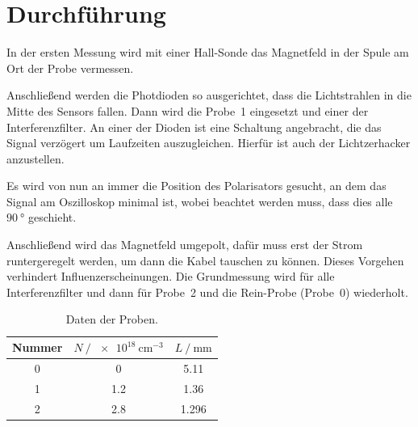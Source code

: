 \section{Durchführung}
\label{sec:durchfuehrung}
In der ersten Messung wird mit einer Hall-Sonde das Magnetfeld in der Spule
am Ort der Probe vermessen.

Anschließend werden die Photdioden so ausgerichtet, dass die Lichtstrahlen in
die Mitte des Sensors fallen.
Dann wird die Probe~1 eingesetzt und einer der Interferenzfilter.
An einer der Dioden ist eine Schaltung angebracht, die das Signal verzögert um
Laufzeiten auszugleichen. Hierfür ist auch der Lichtzerhacker anzustellen.

Es wird von nun an immer die Position des Polarisators gesucht,
an dem das Signal am Oszilloskop minimal ist, wobei beachtet werden muss,
dass dies alle $\SI{90}{\degree}$ geschieht.

Anschließend wird das Magnetfeld umgepolt, dafür muss erst der Strom runtergeregelt werden,
um dann die Kabel tauschen zu können. Dieses Vorgehen verhindert Influenzerscheinungen.
Die Grundmessung wird für alle Interferenzfilter und dann für Probe~2
und die Rein-Probe (Probe~0) wiederholt.
\begin{table}
  \centering
  \caption{Daten der Proben.}
  \label{tab:proben}
  \begin{tabular}{S[table-format=1.0] S[table-format=1.1] S[table-format=1.3]}
    \toprule
    {Nummer} & {$N\:/\:\SI{e18}{\centi\meter\tothe{-3}}$} & {$L\:/\:\si{\milli\meter}$} \\
     & 0   & 5.11  \\
    1 & 1.2 & 1.36  \\
    2 & 2.8 & 1.296 \\
    \bottomrule
  \end{tabular}
\end{table}

